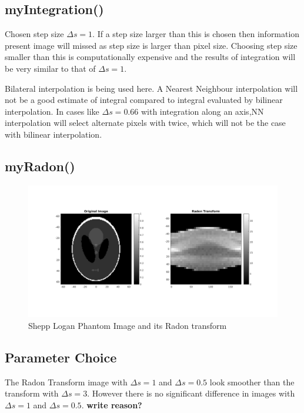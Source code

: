\documentclass[11pt]{article}
\begin{document}
\maketitle

\subsection{myIntegration()}
Chosen step size $\Delta s = 1$. If a step size larger than this is chosen then information present image will missed as step size is larger than pixel size.
Choosing step size smaller than this is computationally expensive and the results of integration will be very similar to that of $\Delta s = 1$.

Bilateral interpolation is being used here. A Nearest Neighbour interpolation will not be a good estimate of integral compared to integral evaluated by bilinear interpolation.
In cases like $\Delta s = 0.66$ with integration along an axis,NN interpolation will select alternate pixels with twice, which will not be the case with bilinear interpolation.
\subsection{myRadon()}

\begin{figure}[h]
\centering
\includegraphics[scale=0.4]{b}
\caption{Shepp Logan Phantom Image and its Radon transform}
\end{figure}

\subsection{Parameter Choice}
The Radon Transform image with $\Delta s=1$ and $\Delta s=0.5$ look smoother than the transform with $\Delta s=3$. 
However there is no significant difference in images with $\Delta s=1$ and $\Delta s=0.5$.
\textbf{write reason?}
\end{document}

